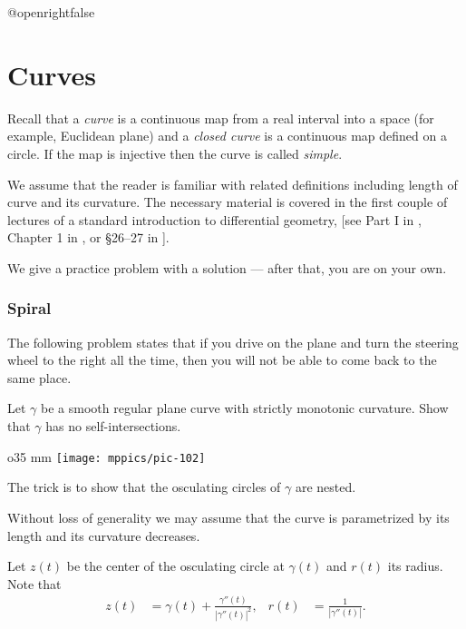 \csname @openrightfalse\endcsname
\chapter{Curves}

Recall that a \emph{curve} is a continuous map 
from a real interval into a space (for example, Euclidean plane)
and 
a {}\emph{closed curve} is a continuous map defined on a circle.
If the map is injective then the curve is called {}\emph{simple}.

We assume that the reader is familiar with related definitions including 
length of curve 
and its curvature.
The necessary material is covered in the first couple of lectures 
of a standard introduction to differential geometry, [see Part I in , Chapter 1 in , or \S26--27 in ].

\medskip

We give a practice problem with a solution --- after that, you are on your own.

\subsection*{Spiral}
\label{spiral}

The following problem states that 
if you drive on the plane and turn the steering wheel to the right all the time,
then you will not be able to come back to the same place.

\begin{pr}
Let $\gamma$ be a smooth regular plane curve with strictly monotonic curvature. 
Show that $\gamma$ has no self-intersections.
\end{pr}

\begin{wrapfigure}{o}{35 mm}
\centering
\texttt{[image: mppics/pic-102]}
\end{wrapfigure}

The trick is to show that the osculating circles of $\gamma$ are nested.

\medskip

Without loss of generality we may assume that the curve is parametrized by its length and its
curvature decreases.

Let $z(t)$ be the center of the osculating circle at $\gamma(t)$
and $r(t)$ its radius.
Note that 
\begin{align*}
z(t)&=\gamma(t)+\tfrac{\gamma''(t)}{|\gamma''(t)|^2},
&
r(t)&=\tfrac{1}{|\gamma''(t)|}.
\end{align*}

